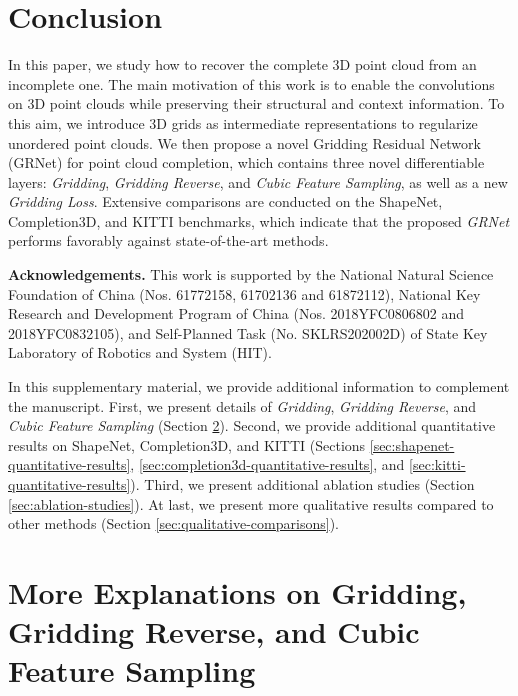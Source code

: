 \documentclass[runningheads]{llncs}
\begin{document}
\section{Conclusion}

In this paper, we study how to recover the complete 3D point cloud from an incomplete one.
The main motivation of this work is to enable the convolutions on 3D point clouds while preserving their structural and context information.
To this aim, we introduce 3D grids as intermediate representations to regularize unordered point clouds.
We then propose a novel Gridding Residual Network (GRNet) for point cloud completion, which contains three novel differentiable layers: {\it Gridding}, {\it Gridding Reverse}, and {\it Cubic Feature Sampling}, as well as a new {\it Gridding Loss}. 
Extensive comparisons are conducted on the ShapeNet, Completion3D, and KITTI benchmarks, which indicate that the proposed {\it GRNet} performs favorably against state-of-the-art methods.

\noindent \textbf{Acknowledgements.}
This work is supported by the National Natural Science Foundation of China (Nos. 61772158, 61702136 and 61872112), National Key Research and Development Program of China (Nos. 2018YFC0806802 and 2018YFC0832105), and Self-Planned Task (No. SKLRS202002D) of State Key Laboratory of Robotics and System (HIT).

\clearpage



\clearpage
\appendix

In this supplementary material, we provide additional information to complement the manuscript.
First, we present details of {\it Gridding}, {\it Gridding Reverse}, and {\it Cubic Feature Sampling} (Section \ref{sec:more-explanations}).
Second, we provide additional quantitative results on ShapeNet, Completion3D, and KITTI (Sections \ref{sec:shapenet-quantitative-results}, \ref{sec:completion3d-quantitative-results}, and \ref{sec:kitti-quantitative-results}). 
Third, we present additional ablation studies (Section \ref{sec:ablation-studies}).
At last, we present more qualitative results compared to other methods (Section \ref{sec:qualitative-comparisons}).

\section{More Explanations on Gridding, Gridding Reverse, and Cubic Feature Sampling}
\label{sec:more-explanations}
\end{document}
